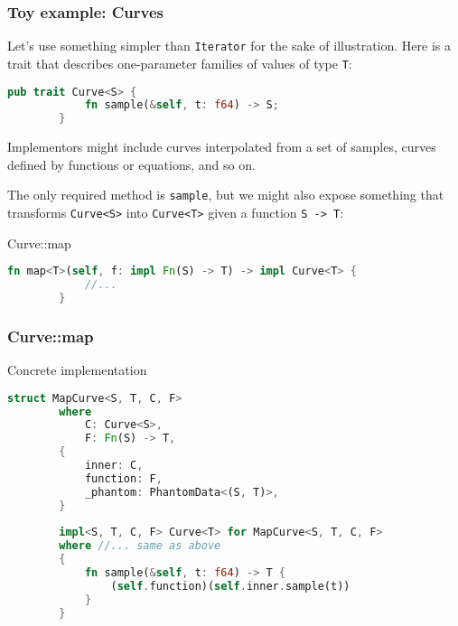 \documentclass[10pt]{beamer}
\begin{document}
\begin{frame}[fragile]
    \frametitle{Toy example: Curves}
    Let's use something simpler than \verb|Iterator| for the sake of illustration. Here is a trait that describes one-parameter families of values of type \verb|T|:
    \begin{lstlisting}[language=Rust, gobble=8]
        pub trait Curve<S> {
            fn sample(&self, t: f64) -> S;
        }
	\end{lstlisting}\pause
	Implementors might include curves interpolated from a set of samples, curves defined by functions or equations, and so on.\pause
	
	The only required method is \texttt{sample}, but we might also expose something that transforms \texttt{Curve<S>} into \texttt{Curve<T>} given a function \verb|S -> T|:
	\begin{block}{Curve::map}
    \begin{lstlisting}[language=Rust, gobble=8]
        fn map<T>(self, f: impl Fn(S) -> T) -> impl Curve<T> {
            //...   
        }
	\end{lstlisting}
	\end{block}
\end{frame}

\begin{frame}[fragile]
    \frametitle{Curve::map}
    \begin{block}{Concrete implementation}
    \begin{lstlisting}[language=Rust, gobble=8]
        struct MapCurve<S, T, C, F> 
        where
            C: Curve<S>,
            F: Fn(S) -> T,
        {
            inner: C,
            function: F,
            _phantom: PhantomData<(S, T)>,
        }
        
        impl<S, T, C, F> Curve<T> for MapCurve<S, T, C, F>
        where //... same as above
        {
            fn sample(&self, t: f64) -> T {
                (self.function)(self.inner.sample(t))
            }
        }
        
	\end{lstlisting}
    \end{block}
\end{frame}
\end{document}
